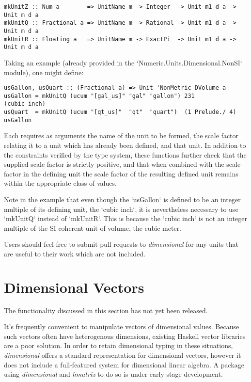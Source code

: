 \documentclass[11pt]{report}
\newcommand{\packagename}[1]{\textit{#1}}
\newcommand{\thispackage}{\packagename{dimensional}}
\newcommand{\prerelease}{\begin{framed}
The functionality discussed in this section has not yet been released.
\end{framed}}
\begin{document}
\begin{lstlisting}
mkUnitZ :: Num a        => UnitName m -> Integer  -> Unit m1 d a -> Unit m d a
mkUnitQ :: Fractional a => UnitName m -> Rational -> Unit m1 d a -> Unit m d a
mkUnitR :: Floating a   => UnitName m -> ExactPi  -> Unit m1 d a -> Unit m d a
\end{lstlisting}

Taking an example (already provided in the `Numeric.Units.Dimensional.NonSI` module), one might define:

\begin{lstlisting}
usGallon, usQuart :: (Fractional a) => Unit 'NonMetric DVolume a
usGallon = mkUnitQ (ucum "[gal_us]" "gal" "gallon") 231             (cubic inch)
usQuart  = mkUnitQ (ucum "[qt_us]"  "qt"  "quart")  (1 Prelude./ 4) usGallon
\end{lstlisting}

Each requires as arguments the name of the unit to be formed, the scale factor relating it to a unit which has already been defined,
and that unit. In addition to the constraints verified by the type system, these functions further check that the supplied scale factor is
strictly positive, and that when combined with the scale factor in the defining unit the scale factor of the resulting defined unit remains
within the appropriate class of values.

Note in the example that even though the `usGallon` is defined to be an integer multiple of its defining unit, the `cubic inch`, it is nevertheless
necessary to use `mkUnitQ` instead of `mkUnitR`. This is because the `cubic inch` is not an integer multiple of the SI coherent unit of volume, the cubic meter.

Users should feel free to submit pull requests to \thispackage{} for any units that are useful to their work which are not included.




\chapter{Dimensional Vectors}

\prerelease{}

It's frequently convenient to manipulate vectors of dimensional values. Because such vectors often have heterogenous
dimensions, existing Haskell vector libraries are a poor solution. In order to retain dimensional typing in these situations,
\thispackage{} offers a standard representation for dimensional vectors, however it does not include a full-featured system for
dimensional linear algebra. A package using \thispackage{} and \packagename{hmatrix} to do so is under early-stage development.
\end{document}
